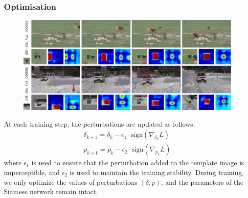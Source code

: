 \documentclass{article}
\begin{document}
\subsubsection{Optimisation}

\begin{figure}[t]
\centering
\includegraphics[width=1\textwidth]{images/vis_2.pdf}
\label{fig:vis}
\end{figure}

At each training step, the perturbations are updated as follows:
\begin{gather}
\delta_{k+1} = \delta_{k} - \epsilon_1 \cdot \text{sign}(\nabla_{\delta_k}L)\\
p_{k+1} = p_{k} - \epsilon_2 \cdot \text{sign}(\nabla_{p_k}L)
\end{gather}
where $\epsilon_1$ is used to ensure that the perturbation added to the template image is imperceptible, and $\epsilon_2$ is used to maintain the training stability.
During training, we only optimize the values of perturbations $(\delta, p)$, and the parameters of the Siamese network remain intact.

\begin{table}[hbtp]
\centering
{}
\caption{Ablation study results on several benchmarks.}
\label{tab:benchmark results}
\end{table}
\end{document}

